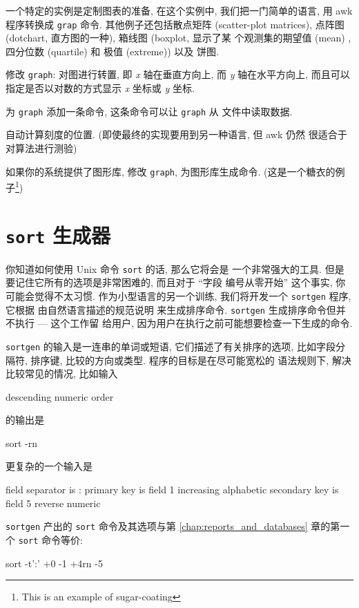 一个特定的实例是定制图表的准备, 在这个实例中, 我们把一门简单的语言, 用
awk 程序转换成 \texttt{grap} 命令. 其他例子还包括散点矩阵 (scatter-plot
matrices), 点阵图 (dotchart, 直方图的一种), 箱线图 (boxplot, 显示了某
个观测集的期望值 (mean) , 四分位数 (quartile) 和 极值 (extreme)) 以及
饼图.

\begin{exercise}
    修改 \texttt{graph}: 对图进行转置, 即 \textit{x} 轴在垂直方向上,
    而 \textit{y} 轴在水平方向上, 而且可以指定是否以对数的方式显示
    \textit{x} 坐标或 \textit{y} 坐标.
\end{exercise}

\begin{exercise}
    为 \texttt{graph} 添加一条命令, 这条命令可以让 \texttt{graph} 从
    文件中读取数据.
\end{exercise}

\begin{exercise}
    自动计算刻度的位置. (即使最终的实现要用到另一种语言, 但 awk 仍然
    很适合于对算法进行测验)
\end{exercise}

\begin{exercise}
    如果你的系统提供了图形库, 修改 \texttt{graph}, 为图形库生成命令.
    (这是一个糖衣的例子\footnote{This is an example of sugar-coating})
\end{exercise}

\section{\textbf{\texttt{sort}} 生成器}
\label{sec:a_sort_generator}

 你知道如何使用 Unix 命令 \texttt{sort} 的话, 那么它将会是
一个非常强大的工具. 但是要记住它所有的选项是非常困难的, 而且对于 ``字段
编号从零开始'' 这个事实, 你可能会觉得不太习惯. 作为小型语言的另一个训练,
我们将开发一个 \texttt{sortgen} 程序, 它根据 由自然语言描述的规范说明
来生成排序命令. \texttt{sortgen} 生成排序命令但并不执行 --- 这个工作留
给用户, 因为用户在执行之前可能想要检查一下生成的命令.

\texttt{sortgen} 的输入是一连串的单词或短语, 它们描述了有关排序的选项,
比如字段分隔符, 排序键, 比较的方向或类型. 程序的目标是在尽可能宽松的
语法规则下, 解决比较常见的情况, 比如输入
\begin{file}
    descending numeric order
\end{file}
的输出是
\begin{shell}
    sort -rn
\end{shell}
更复杂的一个输入是
\begin{file}
    field separator is :
    primary key is field 1
        increasing alphabetic
    secondary key is field 5
        reverse numeric
\end{file}
\texttt{sortgen} 产出的 \texttt{sort} 命令及其选项与第
\ref{chap:reports_and_databases} 章的第一个 \texttt{sort} 命令等价:
\begin{shell}
    sort -t':' +0 -1 +4rn -5
\end{shell}

